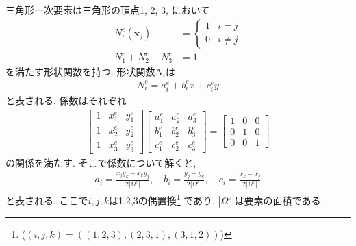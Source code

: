 \documentclass{ltjsarticle}
\begin{document}
三角形一次要素は三角形の頂点1, 2, 3, において
\begin{align}
    N^e_i(\bm{x}_j) &= 
    \begin{cases}
        1 & i = j \\
        0 & i \neq j 
    \end{cases}\\
    N^e_1 + N^e_2 + N^e_3 &= 1
\end{align}
を満たす形状関数を持つ.
形状関数$N_i$は
\begin{align}
    N^e_i = a^e_i +b^e_i x +c^e_i y \label{eq:shape_function}
\end{align}
と表される.
係数はそれぞれ
\begin{align}
    \begin{bmatrix}
        1 & x^e_1 & y^e_1 \\
        1 & x^e_2 & y^e_2 \\
        1 & x^e_3 & y^e_3
    \end{bmatrix}
    \begin{bmatrix}
        a^e_1 & a^e_2 & a^e_3 \\
        b^e_1 & b^e_2 & b^e_3 \\
        c^e_1 & c^e_2 & c^e_3
    \end{bmatrix}
    =
    \begin{bmatrix}
        1 & 0 & 0 \\
        0 & 1 & 0 \\
        0 & 0 & 1
    \end{bmatrix}
\end{align}
の関係を満たす. そこで係数について解くと, 
\begin{align}
    a_i = \frac{x_jy_k - x_ky_j}{2|\Omega^e|},\quad
    b_i = \frac{y_j- y_k}{2|\Omega^e|},\quad
    c_i = \frac{x_k - x_j}{2|\Omega^e|} 
    \label{eq:shape_function_coeff}
\end{align}
と表される. ここで$i,j,k$は1,2,3の偶置換\footnote{($(i,j,k)=((1, 2, 3), (2, 3, 1), (3, 1, 2))$)}
であり, $|\Omega^e|$は要素の面積である.
\end{document}
